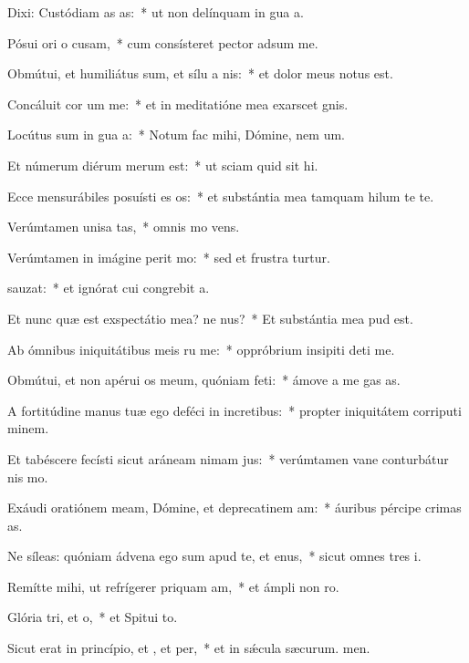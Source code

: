 \item Dixi: Custódiam as as:~* ut non delínquam in gua a.
\item Pósui ori o cusam,~* cum consísteret pector adsum me.
\item Obmútui, et humiliátus sum, et sílu a nis:~* et dolor meus notus est.
\item Concáluit cor um  me:~* et in meditatióne mea exarscet gnis.
\item Locútus sum in gua a:~* Notum fac mihi, Dómine, nem um.
\item Et númerum diérum merum  est:~* ut sciam quid sit hi.
\item Ecce mensurábiles posuísti es os:~* et substántia mea tamquam hilum te te.
\item Verúmtamen unisa tas,~* omnis mo vens.
\item Verúmtamen in imágine perit mo:~* sed et frustra turtur.
\item {}sauzat:~* et ignórat cui congrebit a.
\item Et nunc quæ est exspectátio mea? ne nus?~* Et substántia mea pud  est.
\item Ab ómnibus iniquitátibus meis ru me:~* oppróbrium insipiti deti me.
\item Obmútui, et non apérui os meum, quóniam  feti:~* ámove a me gas as.
\item A fortitúdine manus tuæ ego deféci in incretibus:~* propter iniquitátem corriputi minem.
\item Et tabéscere fecísti sicut aráneam nimam jus:~* verúmtamen vane conturbátur nis mo.
\item Exáudi oratiónem meam, Dómine, et deprecatinem am:~* áuribus pércipe crimas as.
\item Ne síleas: quóniam ádvena ego sum apud te, et enus,~* sicut omnes tres i.
\item Remítte mihi, ut refrígerer priquam am,~* et ámpli non ro.
\item Glória tri, et o,~* et Spitui to.
\item Sicut erat in princípio, et , et per,~* et in sǽcula sæcurum. men.
